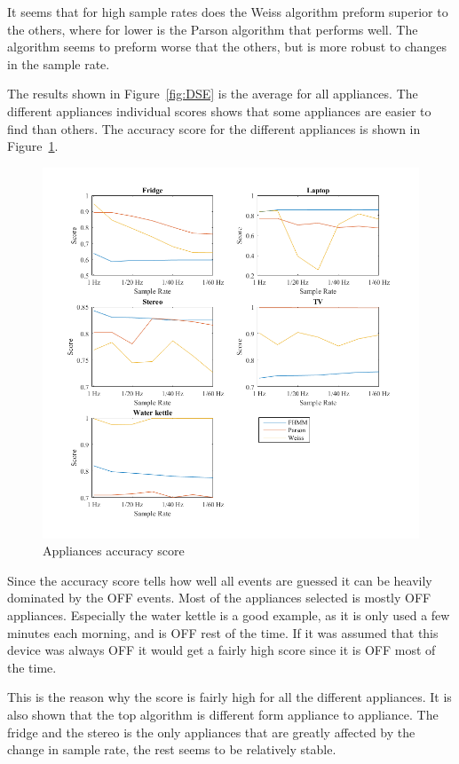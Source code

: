 It seems that for high sample rates does the Weiss algorithm preform superior to the others, where for lower is the Parson algorithm that performs well. The  algorithm seems to preform worse that the others, but is more robust to changes in the sample rate. 

The results shown in Figure~\ref{fig:DSE} is the average for all appliances. The different appliances individual scores shows that some appliances are easier to find than others. The accuracy score for the different appliances is shown in Figure~\ref{fig:AccGS}. 

\begin{figure}[H]
\centering
\includegraphics[width=1\textwidth]{billeder/App-AccuracyScore.png}
\caption{Appliances accuracy score}
\label{fig:AccGS}
\end{figure}

Since the accuracy score tells how well all events are guessed it can be heavily dominated by the OFF events. Most of the appliances selected is mostly OFF appliances. Especially the water kettle is a good example, as it is only used a few minutes each morning, and is OFF rest of the time. If it was assumed that this device was always OFF it would get a fairly high score since it is OFF most of the time.  

This is the reason why the score is fairly high for all the different appliances. It is also shown that the top algorithm is different form appliance to appliance. The fridge and the stereo is the only appliances that are greatly affected by the change in sample rate, the rest seems to be relatively stable.

